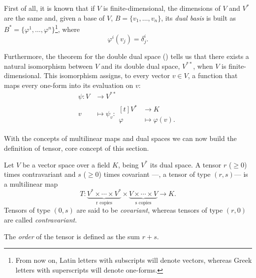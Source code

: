 First of all, it is known that if $V$ is finite-dimensional, the dimensions of $V$ and $V^*$ are the same and, given a base of $V$, $B = \{v_1, \dots, v_n\}$, its \emph{dual basis} is built as $B^* = \{\varphi^1, \dots, \varphi^n\}$\footnote{From now on, Latin letters with subscripts will denote vectors, whereas Greek letters with superscripts will denote one-forms.}, where
\[
	\varphi^i(v_j) = \delta^i_j.
\]

Furthermore, the theorem for the double dual space (\cite[Th. 4.3]{nomizu79}) tells us that there exists a natural isomorphism between $V$ and its double dual space, $V^{**}$, when $V$ is finite-dimensional. This isomorphism assigns, to every vector $v \in V$, a function that maps every one-form into its evaluation on $v$:
\begin{align}
	\label{eq:naturaliso}
	\psi \colon V &\longrightarrow V^{**} \\
	v &\longmapsto \psi_v \colon \begin{aligned}[t]
		V^* &\longrightarrow K \\
		\varphi &\longmapsto \varphi(v).
	\end{aligned} \nonumber
\end{align}

With the concepts of multilinear maps and dual spaces we can now build the definition of tensor, core concept of this section.

\begin{definition}[Tensor]
	\label{def:tensor}
	Let $V$ be a vector space over a field $K$, being $V^*$ its dual space. A tensor $r$ ($\geq 0$) times contravariant and $s$ ($\geq 0$) times covariant ---\ie, a tensor of type $(r,s)$--- is a multilinear map
	\[
		T \colon \underbrace{V^* \times \cdots \times V^*}_{\text{r copies}} \times \underbrace{V \times \cdots \times V}_{\text{s copies}} \longrightarrow K.
	\]
	Tensors of type $(0,s)$ are said to be \emph{covariant}, whereas tensors of type $(r,0)$ are called \emph{contravariant}.

	The \emph{order} of the tensor is defined as the sum $r+s$.
\end{definition}

